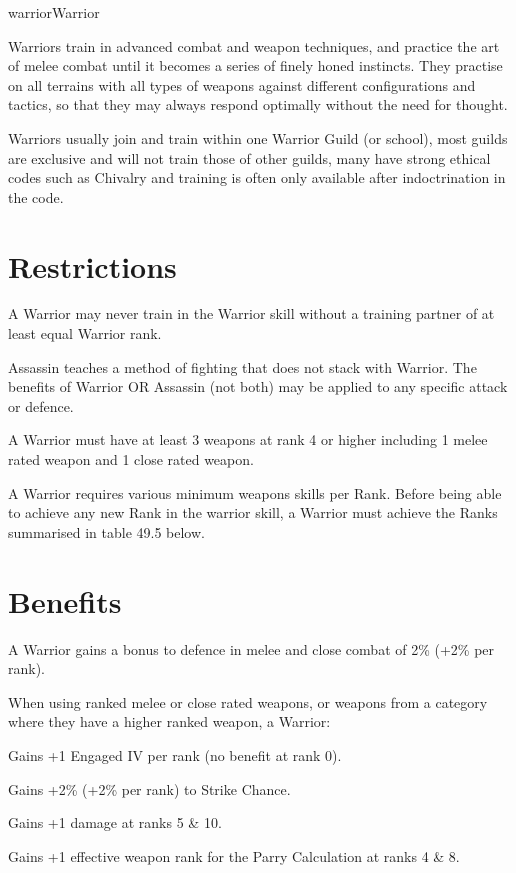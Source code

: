 \begin{Skill}[3.0]{warrior}{Warrior}

Warriors train in advanced combat and weapon techniques, and practice
the art of melee combat until it becomes a series of finely honed
instincts.  They practise on all terrains with all types of weapons
against different configurations and tactics, so that they may always
respond optimally without the need for thought.

Warriors usually join and train within one Warrior Guild (or school),
most guilds are exclusive and will not train those of other guilds,
many have strong ethical codes such as Chivalry and training is often
only available after indoctrination in the code.

\section{Restrictions}

A Warrior may never train in the Warrior skill without a training
partner of at least equal Warrior rank.

Assassin teaches a method of fighting that does not stack with
Warrior.  The benefits of Warrior OR Assassin (not both) may be
applied to any specific attack or defence.

A Warrior must have at least 3 weapons at rank 4 or higher including 1
melee rated weapon and 1 close rated weapon.

A Warrior requires various minimum weapons skills per Rank.  Before
being able to achieve any new Rank in the warrior skill, a Warrior
must achieve the Ranks summarised in table 49.5 below.

\section{Benefits}

A Warrior gains a bonus to defence in melee and close combat of 2\%
(+2\% per rank).

When using ranked melee or close rated weapons, or weapons from a
category where they have a higher ranked weapon, a Warrior:

\begin{Itemize}
\item Gains +1 Engaged IV per rank (no benefit at rank 0).
\item Gains +2\% (+2\% per rank) to Strike Chance.
\item Gains +1 damage at ranks 5 \& 10.
\item Gains +1 effective weapon rank for the Parry Calculation at ranks 4 \& 8. 
\end{Itemize}


\end{Skill}
